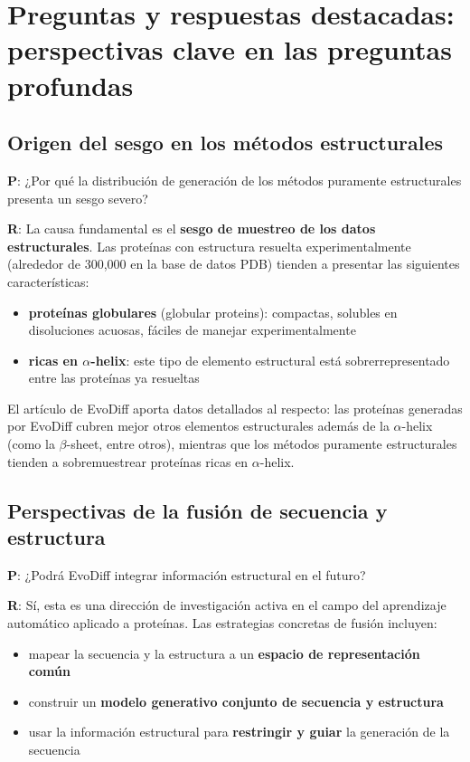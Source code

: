 \section{Preguntas y respuestas destacadas: perspectivas clave en las preguntas profundas}

\subsection{Origen del sesgo en los métodos estructurales}

\textbf{P}: ¿Por qué la distribución de generación de los métodos puramente estructurales presenta un sesgo severo?

\textbf{R}: La causa fundamental es el \textbf{sesgo de muestreo de los datos estructurales}. Las proteínas con estructura resuelta experimentalmente (alrededor de 300,000 en la base de datos PDB) tienden a presentar las siguientes características:
\begin{itemize}
    \item \textbf{proteínas globulares} (globular proteins): compactas, solubles en disoluciones acuosas, fáciles de manejar experimentalmente
    \item \textbf{ricas en $\alpha$-helix}: este tipo de elemento estructural está sobrerrepresentado entre las proteínas ya resueltas
\end{itemize}

El artículo de EvoDiff aporta datos detallados al respecto: las proteínas generadas por EvoDiff cubren mejor otros elementos estructurales además de la $\alpha$-helix (como la $\beta$-sheet, entre otros), mientras que los métodos puramente estructurales tienden a sobremuestrear proteínas ricas en $\alpha$-helix.

\subsection{Perspectivas de la fusión de secuencia y estructura}

\textbf{P}: ¿Podrá EvoDiff integrar información estructural en el futuro?

\textbf{R}: Sí, esta es una dirección de investigación activa en el campo del aprendizaje automático aplicado a proteínas. Las estrategias concretas de fusión incluyen:
\begin{itemize}
    \item mapear la secuencia y la estructura a un \textbf{espacio de representación común}
    \item construir un \textbf{modelo generativo conjunto de secuencia y estructura}
    \item usar la información estructural para \textbf{restringir y guiar} la generación de la secuencia
\end{itemize}

